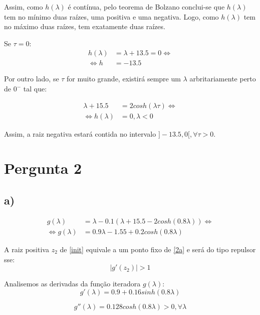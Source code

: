 \documentclass[a4paper, 18pt]{article}
\begin{document}
	\par
	Assim, como $h(\lambda)$ é contínua, pelo teorema de Bolzano conclui-se que $h(\lambda)$ tem no mínimo duas raízes, uma positiva e uma negativa. Logo, como $h(\lambda)$ tem no máximo duas raízes, tem exatamente duas raízes.
	\par
	Se $\tau = 0$:
	\begin{align*}
		h(\lambda) &= \lambda + 13.5 = 0 \Leftrightarrow \\
		\Leftrightarrow h &= -13.5
	\end{align*}

	\par
	Por outro lado, se $\tau$ for muito grande, existirá sempre um $\lambda$ arbritariamente perto de $0^-$ tal que:

	\begin{align*}
		\lambda + 15.5 &= 2cosh(\lambda\tau) \Leftrightarrow \\
		\Leftrightarrow h(\lambda) &= 0, \lambda < 0
	\end{align*}

	\par
	Assim, a raiz negativa estará contida no intervalo $]-13.5, 0[, \forall \tau > 0$.


\section{Pergunta 2}
\subsection*{a)}
	\begin{equation} \label{2a}
	\begin{split}
		g(\lambda) &= \lambda - 0.1(\lambda + 15.5 - 2cosh(0.8\lambda)) \Leftrightarrow \\
		\Leftrightarrow g(\lambda) &= 0.9\lambda - 1.55 + 0.2cosh(0.8\lambda)
	\end{split}
	\end{equation}

	\par
	A raiz positiva $z_2$ de \eqref{init} equivale a um ponto fixo de \eqref{2a} e será do tipo repulsor sse:
	$$|g'(z_2)| > 1$$

	\par
	Analisemos as derivadas da função iteradora $g(\lambda)$:
	$$g'(\lambda) = 0.9 + 0.16sinh(0.8\lambda)$$

	\begin{equation} \label{2a_2nd_der}
		g''(\lambda) = 0.128cosh(0.8\lambda) > 0, \forall \lambda
	\end{equation}
\end{document}
